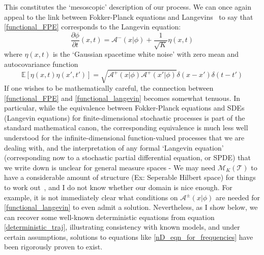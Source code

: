 This constitutes the `mesoscopic' description of our process. We can once again appeal to the link between Fokker-Planck equations and Langevins~\citep{lafuerza_role_2016} to say that \eqref{functional_FPE} corresponds to the Langevin equation:
\begin{equation}
\label{functional_langevin}
    \frac{\partial \phi}{\partial t}(x,t) = \mathcal{A}^{-}(x|\phi) + \frac{1}{\sqrt{K}}\eta(x,t)
\end{equation}
where $\eta(x,t)$  is the `Gaussian spacetime white noise' with zero mean and autocovariance function
\begin{equation*}
    \mathbb{E}[\eta(x,t)\eta(x',t')] = \sqrt{\mathcal{A}^{+}(x|\phi)\mathcal{A}^{+}(x'|\phi)}\delta(x-x')\delta(t-t')
\end{equation*}
If one wishes to be mathematically careful, the connection between \eqref{functional_FPE} and \eqref{functional_langevin} becomes somewhat tenuous. In particular, while the equivalence between Fokker-Planck equations and SDEs (Langevin equations) for finite-dimensional stochastic processes is part of the standard mathematical canon, the corresponding equivalence is much less well understood for the infinite-dimensional function-valued processes that we are dealing with, and the interpretation of any formal `Langevin equation' (corresponding now to a stochastic partial differential equation, or SPDE) that we write down is unclear for general measure spaces - We may need $\mathcal{M}_{K}(\mathcal{T})$ to have a considerable amount of structure (Ex: Seperable Hilbert space) for things to work out~\citep{da_prato_stochastic_2014,balan_gentle_2018}, and I do not know whether our domain is nice enough. For example, it is not immediately clear what conditions on $\mathcal{A}^{\pm}(x | \phi)$ are needed for \eqref{functional_langevin} to even admit a solution. Nevertheless, as I show below, we can recover some well-known deterministic equations from equation \eqref{deterministic_traj}, illustrating consistency with known models, and under certain assumptions, solutions to equations like \eqref{nD_eqn_for_frequencies} have been rigorously proven to exist.

